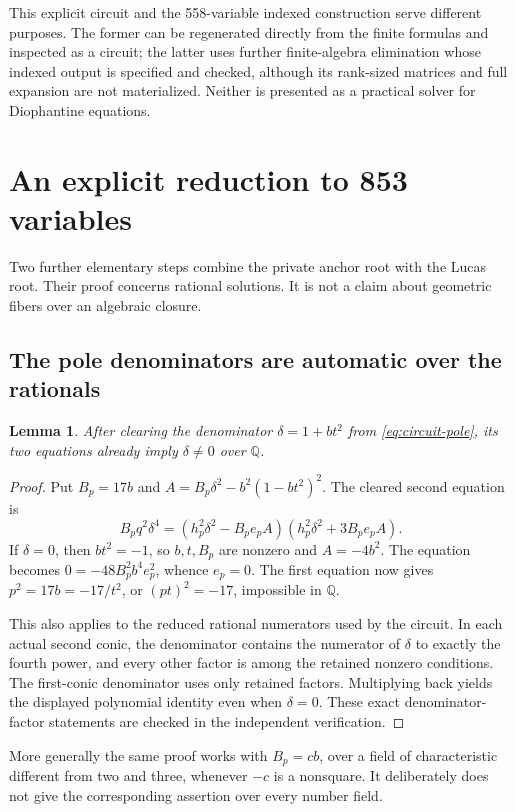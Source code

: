 \documentclass[11pt]{article}
\newtheorem{lemma}[theorem]{Lemma}
\theoremstyle{definition}
\newcommand{\Q}{\mathbb Q}
\begin{document}
This explicit circuit and the 558-variable indexed construction
serve different purposes. The former can be regenerated directly from
the finite formulas and inspected as a circuit; the latter uses further
finite-algebra elimination whose indexed output is specified and checked,
although its rank-sized matrices and full expansion are not materialized.
Neither is presented as a practical solver for Diophantine equations.


\section{An explicit reduction to 853 variables}
\label{sec:explicit-853}

Two further elementary steps combine the private anchor root with the
Lucas root. Their proof concerns rational solutions. It is not a claim
about geometric fibers over an algebraic closure.

\subsection{The pole denominators are automatic over the rationals}

\begin{lemma}\label{lem:pole-denominator-automatic}
After clearing the denominator $\delta=1+bt^2$ from
\eqref{eq:circuit-pole}, its two equations already imply
$\delta\ne0$ over $\Q$.
\end{lemma}
\begin{proof}
Put $B_p=17b$ and
$A=B_p\delta^2-b^2(1-bt^2)^2$. The cleared second equation is
\[
 B_pq^2\delta^4
 =(h_p^2\delta^2-B_pe_pA)(h_p^2\delta^2+3B_pe_pA).
\]
If $\delta=0$, then $bt^2=-1$, so $b,t,B_p$ are nonzero and
$A=-4b^2$. The equation becomes $0=-48B_p^2b^4e_p^2$, whence
$e_p=0$. The first equation now gives $p^2=17b=-17/t^2$,
or $(pt)^2=-17$, impossible in $\Q$.

This also applies to the reduced rational numerators used by the
circuit. In each actual second conic, the denominator contains the
numerator of $\delta$ to exactly the fourth power, and every other
factor is among the retained nonzero conditions. The first-conic
denominator uses only retained factors. Multiplying back yields the
displayed polynomial identity even when $\delta=0$. These exact
denominator-factor statements are checked in the independent verification.
\end{proof}

More generally the same proof works with $B_p=cb$, over a field of
characteristic different from two and three, whenever $-c$ is a
nonsquare. It deliberately does not give the corresponding assertion
over every number field.
\end{document}
